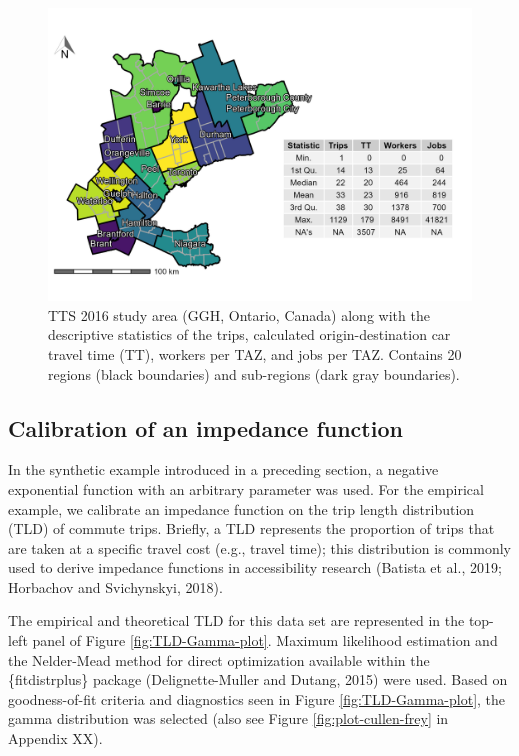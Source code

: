 \documentclass[]{elsarticle} %
\begin{document}
\begin{figure}

{\centering \includegraphics[width=0.8\linewidth]{images/TTS16-survey-area} 

}

\caption{\label{fig:TTS-16-survey-area}TTS 2016 study area (GGH, Ontario, Canada) along with the descriptive statistics of the trips, calculated origin-destination car travel time (TT), workers per TAZ, and jobs per TAZ. Contains 20 regions (black boundaries) and sub-regions (dark gray boundaries).}\label{fig:TTS-16-survey-area}
\end{figure}

\hypertarget{calibration-of-an-impedance-function}{%
\subsection{Calibration of an impedance
function}\label{calibration-of-an-impedance-function}}

In the synthetic example introduced in a preceding section, a negative
exponential function with an arbitrary parameter was used. For the
empirical example, we calibrate an impedance function on the trip length
distribution (TLD) of commute trips. Briefly, a TLD represents the
proportion of trips that are taken at a specific travel cost (e.g.,
travel time); this distribution is commonly used to derive impedance
functions in accessibility research (Batista et al., 2019; Horbachov and
Svichynskyi, 2018).

The empirical and theoretical TLD for this data set are represented in
the top-left panel of Figure \ref{fig:TLD-Gamma-plot}. Maximum
likelihood estimation and the Nelder-Mead method for direct optimization
available within the \{fitdistrplus\} package (Delignette-Muller and
Dutang, 2015) were used. Based on goodness-of-fit criteria and
diagnostics seen in Figure \ref{fig:TLD-Gamma-plot}, the gamma
distribution was selected (also see Figure \ref{fig:plot-cullen-frey} in
Appendix XX).
\end{document}
